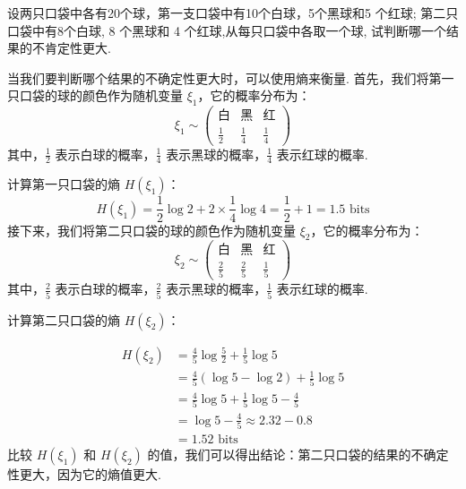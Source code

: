 \begin{tcolorbox}[breakable,colback=blue!5!white,colframe=blue!75!black,
 title=计算题]
设两只口袋中各有20个球，第一支口袋中有10个白球，5个黑球和5 个红球; 第二只口袋中有8个白球, 8 个黑球和 4 个红球,从每只口袋中各取一个球, 试判断哪一个结果的不肯定性更大.


 \tcblower
当我们要判断哪个结果的不确定性更大时，可以使用熵来衡量.
首先，我们将第一只口袋的球的颜色作为随机变量 $\xi_1$，它的概率分布为：
$$
\xi_1 \sim \left(\begin{array}{ccc}\text{白} & \text{黑} & \text{红} \\ \frac{1}{2} & \frac{1}{4} & \frac{1}{4}\end{array}\right)
$$
其中，$\frac{1}{2}$ 表示白球的概率，$\frac{1}{4}$ 表示黑球的概率，$\frac{1}{4}$ 表示红球的概率.

计算第一只口袋的熵 $H(\xi_1)$：
$$ H\left(\xi_{1}\right)=\frac{1}{2} \log 2+2 \times \frac{1}{4} \log 4=\frac{1}{2}+1=1.5  \text{ bits}
$$
接下来，我们将第二只口袋的球的颜色作为随机变量 $\xi_2$，它的概率分布为：
$$
\xi_2 \sim \left(\begin{array}{ccc}\text{白} & \text{黑} & \text{红} \\ \frac{2}{5} & \frac{2}{5} & \frac{1}{5}\end{array}\right)
$$
其中，$\frac{2}{5}$ 表示白球的概率，$\frac{2}{5}$ 表示黑球的概率，$\frac{1}{5}$ 表示红球的概率.

计算第二只口袋的熵 $H(\xi_2)$：

$$
\begin{aligned}
H\left(\xi_{2}\right) & =\frac{4}{5} \log \frac{5}{2}+\frac{1}{5} \log 5 \\
& =\frac{4}{5}(\log 5-\log 2)+\frac{1}{5} \log 5 \\
& =\frac{4}{5} \log 5+\frac{1}{5} \log 5-\frac{4}{5} \\
& =\log 5-\frac{4}{5} \approx 2.32-0.8 \\
& =1.52 \text { bits }
\end{aligned}
$$
比较 $H(\xi_1)$ 和 $H(\xi_2)$ 的值，我们可以得出结论：第二只口袋的结果的不确定性更大，因为它的熵值更大. 
\end{tcolorbox}



